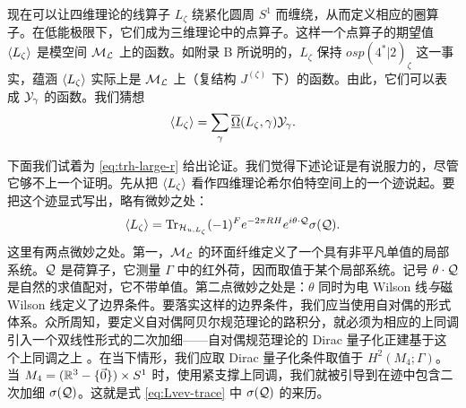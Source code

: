 现在可以让四维理论的线算子 $L_\zeta$ 绕紧化圆周 $S^1$ 而缠绕，从而定义相应的圈算子。在低能极限下，它们成为三维理论中的点算子。这样一个点算子的期望值 $\langle L_\zeta \rangle$ 是模空间 $\mathcal{M}_{\mathcal{L}}$ 上的函数。如附录 B%
所说明的，$L_\zeta$ 保持 $osp(4^*\vert 2)_\zeta$ 这一事实，蕴涵 $\langle L_\zeta \rangle$ 实际上是 $\mathcal{M}_{\mathcal{L}}$ 上（复结构 $J^{(\zeta)}$ 下）的函数。由此，它们可以表成 $\mathcal{Y}_\gamma$ 的函数。我们猜想
\begin{equation} \label{eq:trh-large-r}
\langle L_\zeta \rangle = \sum_\gamma \overline{\underline{\Omega}}(L_\zeta, \gamma) \mathcal{Y}_\gamma.
\end{equation}

下面我们试着为 \eqref{eq:trh-large-r}
给出论证。我们觉得下述论证是有说服力的，尽管它够不上一个证明。先从把 $\langle L_\zeta \rangle$ 看作四维理论希尔伯特空间上的一个迹说起。要把这个迹显式写出，略有微妙之处：
\begin{equation}\label{eq:Lvev-trace}
\langle L_\zeta \rangle = {\rm Tr}_{\mathcal{H}_{u,L_\zeta}} (-1)^F e^{-2 \pi R H} e^{i \theta\cdot \mathcal{Q}}\sigma(\mathcal{Q}).
\end{equation}
这里有两点微妙之处。第一，$\mathcal{M}_{\mathcal{L}}$ 的环面纤维定义了一个具有非平凡单值的局部系统。$\mathcal{Q}$ 是荷算子，它测量 $\Gamma$ 中的红外荷，因而取值于某个局部系统。记号 $\theta\cdot\mathcal{Q}$ 是自然的求值配对，它不带单值。第二点微妙之处是：$\theta$ 同时为电 Wilson 线\emph{与}磁 Wilson 线定义了边界条件。要落实这样的边界条件，我们应当使用自对偶的形式体系。众所周知，要定义自对偶阿贝尔规范理论的路积分，就必须为相应的上同调引入一个双线性形式的二次加细——自对偶规范理论的 Dirac 量子化正建基于这个上同调之上 \cite{Witten:1996hc,Freed:2000ta,Hopkins:2002rd,Belov:2006jd}。在当下情形，我们应取 Dirac 量子化条件取值于 $H^2(M_4;\Gamma)$。当 $M_4=(\mathbb{R}^3-\{\vec 0\})\times S^1$ 时，使用紧支撑上同调，我们就被引导到在迹中包含二次加细 $\sigma(\mathcal{Q})$。这就是式 \eqref{eq:Lvev-trace}
中 $\sigma(\mathcal{Q})$ 的来历。

